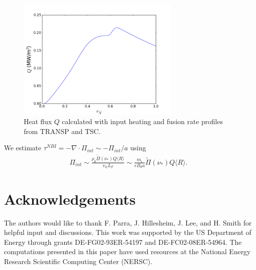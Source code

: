 \documentclass{article}
\numberwithin{figure}{section}
\numberwithin{equation}{section}
\begin{document}
\begin{figure}[h!]
\centering
\includegraphics[width=0.7\textwidth]{turbHeatFlux.png}
\caption{\label{fig:turbHeatFlux} Heat flux $Q$ calculated with input heating and fusion rate profiles from TRANSP and TSC.}
\end{figure}

We estimate $\tau^{NBI} = - \nabla \cdot \Pi_{int} \sim -\Pi_{int}/a$ using 
\begin{gather}
\Pi_{int} \sim \frac{\rho_{\theta} \widetilde{\Pi}(\nu_*) Q \langle R \rangle}{v_{ti} L_T} \sim \frac{m_i}{e B_{\theta} a}\widetilde{\Pi}(\nu_*) Q \langle R \rangle.
\end{gather}

\FloatBarrier

\section*{Acknowledgements}
The authors would like to thank F. Parra, J. Hillesheim, J. Lee, and H. Smith for helpful input and discussions. This work was supported by the US Department of Energy through grants DE-FG02-93ER-54197 and DE-FC02-08ER-54964. The computations presented in this paper have used resources at the National Energy Research Scientific Computing Center (NERSC). 


\small

\end{document}
